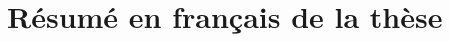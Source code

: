 \renewcommand{\thesection}{\Alph{section}}

\section{Résumé en français de la thèse\label{chap:french}}

